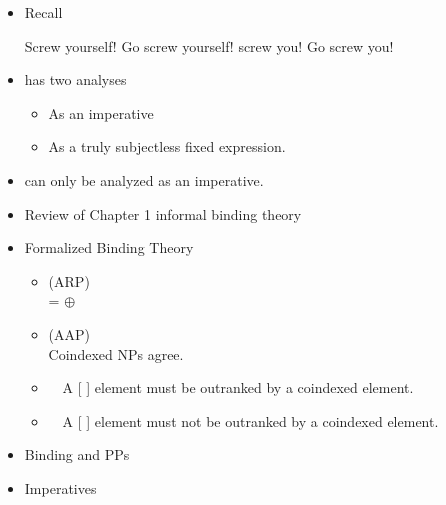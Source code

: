 \documentclass[a4paper,landscape,headrule,footrule]{foils}
\begin{document}
\begin{itemize}
\item Recall
  \begin{exe}
    \ix Screw yourself!
    \ix Go screw yourself!
    \ix screw you!
    \ix *Go screw you!
  \end{exe}
\item {} has two analyses
  \begin{itemize}
  \item As an imperative
  \item As a truly subjectless fixed expression.
  \end{itemize}
\item {} can only be analyzed as an imperative.
\end{itemize}


\begin{itemize}\addtolength{\itemsep}{-2ex}
\item Review of Chapter 1 informal binding
theory
\item Formalized Binding Theory
  \begin{itemize}
  \item {} (ARP)
    \\   =   $\oplus$ 
  \item {} (AAP)
   \\ Coindexed NPs agree.
 \item {}\ \  A [ ] element must be
outranked by a coindexed element.
\item {}\ \  A [ ] element must not
be outranked by a coindexed element.
  \end{itemize}
\item Binding and PPs
\item Imperatives
\end{itemize}


\end{document}

